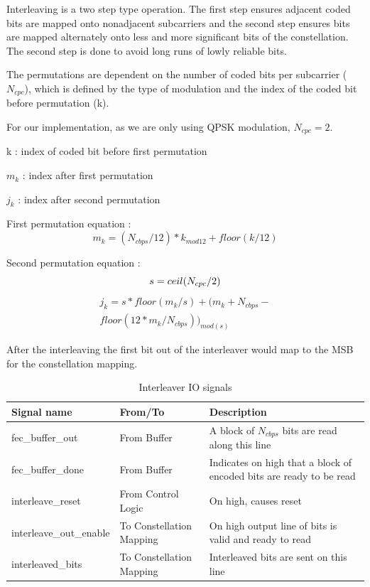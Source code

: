 \documentclass[dvips,10pt,twocolumn]{article}
\begin{document}
	Interleaving is a two step type operation. The first step ensures adjacent 
	coded bits are mapped onto nonadjacent subcarriers and the second step 
	ensures bits are mapped alternately onto less and more significant bits of
	the constellation. The second step is done to avoid long runs of lowly
	reliable bits.
	 
	The permutations are dependent on the number of coded bits per subcarrier
	($N_{cpc}$), which is defined by the type of modulation and the index of the
	coded bit before permutation (k).

	For our implementation, as we are only using QPSK modulation,
	$N_{cpc} = 2$.
	
	k : index of coded bit before first permutation

	$m_{k}$ : index after first permutation

	$j_{k}$ : index after second permutation 

  First permutation equation :
  \begin{equation}
  m_k = (N_{cbps}/12)*k_{mod12}+floor(k/12)
  \end{equation}

	Second permutation equation :
	\begin{equation}
	s=ceil(N_{cpc}/2) \\
	\end{equation}
	\begin{eqnarray}
	j_k = s*floor(m_{k}/s)+(m_{k}+N_{cbps}- \nonumber \\
		floor(12*m_k/N_{cbps}))_{mod(s)}
	\end{eqnarray}

	After the interleaving the first bit out of the interleaver would map to the
	MSB for the constellation mapping. 
	
	\begin{table}
		\begin{tabularx}{\textwidth}{X|X|X|}
		\label{tbl:interleave}
			Signal name & From/To &
			Description \\ \hline
			fec\_buffer\_out & From Buffer & A block of $N_{cbps}$ bits are read
			along this line \\ \hline
			fec\_buffer\_done & From Buffer & Indicates on high that a block of
		 	encoded bits are ready to be read \\ \hline
			interleave\_reset & From Control Logic & On high, causes reset\\ \hline
			interleave\_out\_enable & To Constellation Mapping & On high output
			line of bits is valid and ready to read \\ \hline
			interleaved\_bits & To Constellation Mapping & Interleaved bits are
			sent on this line \\ \hline
		\end{tabularx}
		\caption{Interleaver IO signals}
	\end{table}
	
\end{document}
